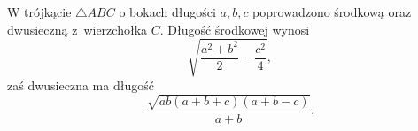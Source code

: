 \begin{corollary}
	W trójkącie $\triangle ABC$ o bokach długości $a, b, c$ poprowadzono środkową oraz dwusieczną z~wierzchołka $C$.
	Długość środkowej wynosi
	\begin{equation}
		\sqrt{\frac{a^2 + b^2}{2} - \frac{c^2}{4}},
	\end{equation}
	zaś dwusieczna ma długość
	\begin{equation}
		\frac{\sqrt{ab (a+b+c)(a+b-c)}}{a+b}.
	\end{equation}
\end{corollary}